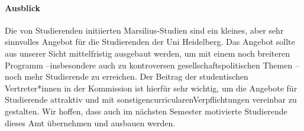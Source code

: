 \paragraph{Ausblick}
Die von Studierenden initiierten Marsilius-Studien sind ein kleines, aber sehr sinnvolles Angebot für die Studierenden der Uni Heidelberg. Das Angebot sollte aus unserer Sicht mittelfristig ausgebaut werden,  um  mit  einem  noch  breiteren  Programm –insbesondere  auch  zu  kontroversen  gesellschaftspolitischen  Themen –noch  mehr  Studierende  zu  erreichen.  Der  Beitrag  der  studentischen Vertreter*innen  in  der  Kommission  ist  hierfür  sehr  wichtig,  um  die  Angebote  für  Studierende  attraktiv und mit sonstigencurricularenVerpflichtungen vereinbar zu gestalten. Wir hoffen, dass auch im nächsten Semester motivierte Studierende dieses Amt übernehmen und ausbauen werden.